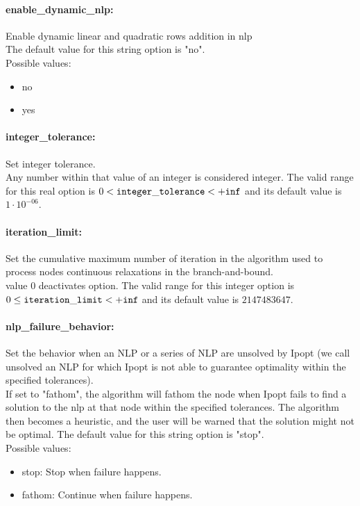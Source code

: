 \paragraph{enable\_dynamic\_nlp:}\label{opt:enable_dynamic_nlp} Enable dynamic linear and quadratic rows addition in nlp \\
 The default value for this string option is "no".
\\ 
Possible values:
\begin{itemize}
   \item no
   \item yes
\end{itemize}

\paragraph{integer\_tolerance:}\label{opt:integer_tolerance} Set integer tolerance. \\
 Any number within that value of an integer is considered integer. The valid range for this real option is 
$0 <  {\tt integer\_tolerance } <  {\tt +inf}$
and its default value is $1 \cdot 10^{-06}$.


\paragraph{iteration\_limit:}\label{opt:iteration_limit} Set the cumulative maximum number of iteration in the algorithm used to process nodes continuous relaxations in the branch-and-bound. \\
 value 0 deactivates option. The valid range for this integer option is
$0 \le {\tt iteration\_limit } <  {\tt +inf}$
and its default value is $2147483647$.


\paragraph{nlp\_failure\_behavior:}\label{opt:nlp_failure_behavior} Set the behavior when an NLP or a series of NLP are unsolved by Ipopt (we call unsolved an NLP for which Ipopt is not able to guarantee optimality within the specified tolerances). \\
 If set to "fathom", the algorithm will fathom the node when Ipopt fails to find a solution to the nlp at that node within the specified tolerances. The algorithm then becomes a heuristic, and the user will be warned that the solution might not be optimal. The default value for this string option is "stop".
\\ 
Possible values:
\begin{itemize}
   \item stop: Stop when failure happens.
   \item fathom: Continue when failure happens.
\end{itemize}

